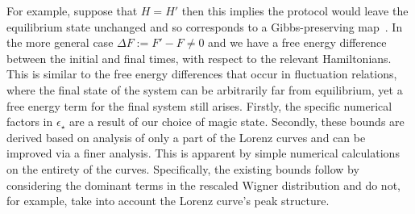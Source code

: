 \documentclass[pra,
aps,
twocolumn,
superscriptaddress,
groupedaddress,
nofootinbib,
reprint
]{revtex4-1}
\begin{document}
  For example, suppose that $H=H'$ then this implies the protocol would leave the equilibrium state unchanged and so corresponds to a Gibbs-preserving map~\cite{faist_2015}. In the more general case $\Delta F := F' - F \ne 0$ and we have a free energy difference between the initial and final times, with respect to the relevant Hamiltonians. This is similar to the free energy differences that occur in fluctuation relations, where the final state of the system can be arbitrarily far from equilibrium, yet a free energy term for the final system still arises.
Firstly, the specific numerical factors in $\epsilon_\star$ are a result of our choice of magic state. 
Secondly, these bounds are derived based on analysis of only a part of the Lorenz curves and can be improved via a finer analysis. 
This is apparent by simple numerical calculations on the entirety of the curves.
Specifically, the existing bounds follow by considering the dominant terms in the rescaled Wigner distribution and do not, for example, take into account the Lorenz curve's peak structure. 
\end{document}
